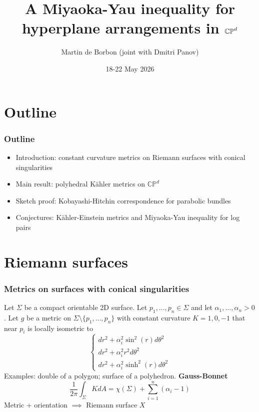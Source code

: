 \documentclass{beamer}
\title[]{A Miyaoka-Yau inequality for hyperplane arrangements in \(\CP^d\)}
\author[Martin de Borbon]{Martin de Borbon (joint with Dmitri Panov)}
\institute[Loughborough]{Living on the edge of the moduli space, Aarhus}
\date[18 May, Aarhus]{18-22 May 2026}
\newcommand{\CP}{\mathbb{CP}}
\begin{document}
\begin{frame}
  \titlepage
\end{frame}

\section{Outline}
\begin{frame}
	\frametitle{Outline}
	\begin{itemize}
		\setlength{\itemsep}{\fill}
		
		\pause
		\item Introduction: 
		constant curvature metrics on Riemann surfaces with conical singularities
		
		\pause
		\item Main result: 
		polyhedral K\"ahler metrics on \(\CP^d\)
		
		\pause
		\item Sketch proof: 
		Kobayashi-Hitchin correspondence for parabolic bundles  
		
		\pause
		\item Conjectures: 
		K\"ahler-Einstein metrics and Miyaoka-Yau inequality for log pairs
	\end{itemize}
\end{frame}

\section{Riemann surfaces}

\begin{frame}
	\frametitle{Metrics on surfaces with conical singularities}
	\pause
	Let \(\Sigma\) be a compact orientable 2D surface.
	\pause
	Let \(p_1, \ldots, p_n \in \Sigma\) and let \(\alpha_1, \ldots, \alpha_n >0\).
	\pause
	Let \(g\) be a metric on \(\Sigma \setminus \{p_1, \ldots, p_n\}\) with constant curvature \(K = 1, 0, -1\) that near \(p_i\) is locally isometric to
	\[
	\begin{cases}
	dr^2 + \alpha_i^2 \sin^2(r) d\theta^2 \\
	dr^2 + \alpha_i^2 r^2 d\theta^2 \\
	dr^2 + \alpha_i^2 \sinh^2(r) d\theta^2 
	\end{cases}
	\]
	\pause
	Examples: double of a polygon;
	\pause 
	surface of a polyhedron.
	\pause
	\textbf{Gauss-Bonnet}
	\[
	\frac{1}{2\pi} \int_{\Sigma} K dA = \chi(\Sigma) + \sum_{i=1}^{n} (\alpha_i-1)
	\]
	\pause
	Metric + orientation \(\implies\) Riemann surface \(X\) 
\end{frame}
\end{document}
